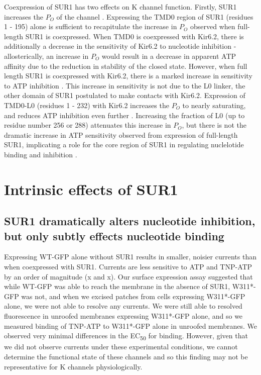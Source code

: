Coexpression of SUR1 has two effects on K\ATP{} channel function.
Firstly, SUR1 increases the $P_O$ of the channel \cite{tucker_truncation_1997, john_sulphonylurea_1998, chan_n-terminal_2003-1}.
Expressing the TMD0 region of SUR1 (residues 1 - 195) alone is sufficient to recapitulate the increase in $P_O$ observed when full-length SUR1 is coexpressed\cite{babenko_sur_2003-1, chan_n-terminal_2003-1}.
When TMD0 is coexpressed with Kir6.2, there is additionally a decrease in the sensitivity of Kir6.2 to nucleotide inhibition - allosterically, an increase in $P_O$ would result in a decrease in apparent ATP affinity due to the reduction in stability of the closed state.
However, when full length SUR1 is coexpressed with Kir6.2, there is a marked increase in sensitivity to ATP inhibition \cite{tucker_truncation_1997, john_sulphonylurea_1998, chan_n-terminal_2003-1, ribalet_atp-sensitive_2006}.
This increase in sensitivity is not due to the L0 linker, the other domain of SUR1 postulated to make contacts with Kir6.2.
Expression of TMD0-L0 (residues 1 - 232) with Kir6.2 increases the $P_O$ to nearly saturating, and reduces ATP inhibition even further \cite{babenko_sur_2003-1}.
Increasing the fraction of L0 (up to residue number 256 or 288) attenuates this increase in $P_O$, but there is not the dramatic increase in ATP sensitivity observed from expression of full-length SUR1, implicating a role for the core region of SUR1 in regulating nuclelotide binding and inhibition \cite{puljung_cryo-electron_2018}.

\section{Intrinsic effects of SUR1}

\subsection{SUR1 dramatically alters nucleotide inhibition, but only subtly effects nucleotide binding}
Expressing WT-GFP alone without SUR1 results in smaller, noisier currents than when coexpressed with SUR1.
Currents are less sensitive to ATP and TNP-ATP by an order of magnitude (x and x).
Our surface expression assay suggested that while WT-GFP was able to reach the membrane in the absence of SUR1, W311*-GFP was not, and when we excised patches from cells expressing W311*-GFP alone, we were not able to resolve any currents.
We were still able to resolved fluorescence in unroofed membranes expressing W311*-GFP alone, and so we measured binding of TNP-ATP to W311*-GFP alone in unroofed membranes.
We observed very minimal differences in the EC\textsubscript{50} for binding.
However, given that we did not observe currents under these experimental conditions, we cannot determine the functional state of these channels and so this finding may not be representative for K\ATP{} channels physiologically.

